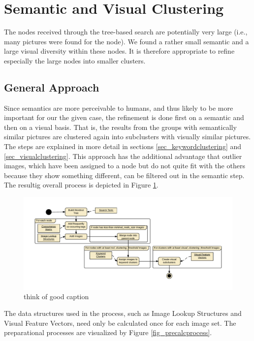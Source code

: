 %
\section{Semantic and Visual Clustering}
\label{sec_inhalt}

The nodes received through the tree-based search are potentially very large (i.e., many pictures were found for the node). We found a rather small semantic and a large visual diversity within these nodes. It is therefore appropriate to refine especially the large nodes into smaller clusters.

\subsection{General Approach}
Since semantics are more perceivable to humans, and thus likely to be more important for our the given case, the refinement is done first on a semantic and then on a visual basis. That is, the results from the groups with semantically similar pictures are clustered again into subclusters with visually similar pictures. The steps are explained in more detail in sections \ref{sec_keywordclustering} and \ref{sec_visualclustering}.
This approach has the additional advantage that outlier images, which have been assigned to a node but do not quite fit with the others because they show something different, can be filtered out in the semantic step. \\
The resultig overall process is depicted in Figure \ref{fig_overallprocess}. 

\begin{figure}[h]
\centering
\includegraphics[width=\textwidth]{images/searchprocess_diagram_color.pdf}
\caption{think of good caption}
\label{fig_overallprocess}
\end{figure}

The data structures used in the process, such as Image Lookup Structures and Visual Feature Vectors, need only be calculated once for each image set. The preparational processes are visualized by Figure \ref{fig_precalcprocess}.

